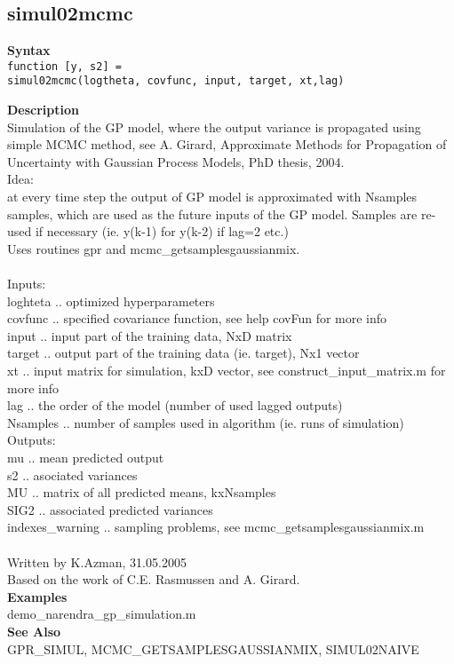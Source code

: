 \subsection*{simul02mcmc} \label{fun:simul02mcmc}

\textbf{Syntax}
\\  \texttt{function [y, s2] = \\
\tab simul02mcmc(logtheta, covfunc, input, target, xt,lag)}

\textbf{Description}
\\ Simulation of the GP model, where the output variance is propagated using
 simple MCMC method, see A. Girard, Approximate Methods for
Propagation of  Uncertainty with Gaussian Process Models, PhD
thesis, 2004.
\\ Idea:
\\ at every time step the output of GP model is approximated with
 Nsamples samples, which are used as the future inputs of the GP
model.
 Samples are re-used if necessary (ie. y(k-1) for y(k-2) if lag=2
etc.) \\
 Uses routines gpr and mcmc\_getsamplesgaussianmix.
\\
\\ Inputs:
\\ loghteta .. optimized hyperparameters
\\ covfunc .. specified covariance function, see help covFun for more info
\\ input .. input part of the training data,  NxD matrix
\\ target .. output part of the training data (ie. target), Nx1 vector
\\ xt .. input matrix for simulation, kxD vector, see
  construct\_input\_matrix.m for more info
\\ lag .. the order of the model (number of used lagged outputs)
\\ Nsamples .. number of samples used in algorithm (ie. runs of simulation)
\\ Outputs:
\\ mu .. mean predicted output
\\ s2 .. asociated variances
\\ MU .. matrix of all predicted means, kxNsamples
\\ SIG2 .. associated predicted variances
\\ indexes\_warning .. sampling problems, see mcmc\_getsamplesgaussianmix.m
\\
\\ Written by K.Azman, 31.05.2005
\\ Based on the work of C.E. Rasmussen and A. Girard.
\\\textbf{Examples}
\\ demo\_narendra\_gp\_simulation.m
\\\textbf{See Also}
\\ GPR\_SIMUL, MCMC\_GETSAMPLESGAUSSIANMIX, SIMUL02NAIVE

